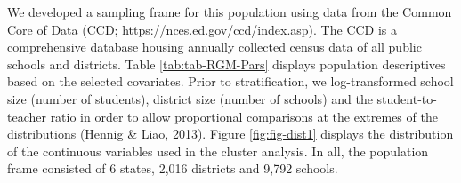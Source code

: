 \documentclass[
  english,
  man,floatsintext]{apa6}
\begin{document}
We developed a sampling frame for this population using data from the Common Core of Data (CCD; \url{https://nces.ed.gov/ccd/index.asp}). The CCD is a comprehensive database housing annually collected census data of all public schools and districts. Table \ref{tab:tab-RGM-Pars} displays population descriptives based on the selected covariates. Prior to stratification, we log-transformed school size (number of students), district size (number of schools) and the student-to-teacher ratio in order to allow proportional comparisons at the extremes of the distributions (Hennig \& Liao, 2013). Figure \ref{fig:fig-dist1} displays the distribution of the continuous variables used in the cluster analysis. In all, the population frame consisted of 6 states, 2,016 districts and 9,792 schools.

\begin{table}[!h]


\end{table}
\end{document}
